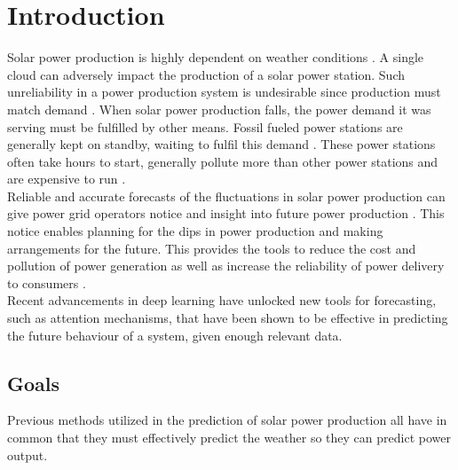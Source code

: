 \chapter{Introduction\label{cha:introduction}}

\vspace{1.5cm}

Solar power production is highly dependent on weather conditions \cite{lin_temporal_2020, lee_forecasting_2018, jaidee_very_2019, su_machine_2019, jang_solar_2016, jimenez_wrf-solar_2016, rognvaldsson_numerical_2013}. A single cloud can adversely impact the production of a solar power station. Such unreliability in a power production system is undesirable since production must match demand \cite{lee_forecasting_2018}. When solar power production falls, the power demand it was serving must be fulfilled by other means. Fossil fueled power stations are generally kept on standby, waiting to fulfil this demand \cite{lee_forecasting_2018}. These power stations often take hours to start, generally pollute more than other power stations and are expensive to run \cite{lee_forecasting_2018}.\\
Reliable and accurate forecasts of the fluctuations in solar power production can give power grid operators notice and insight into future power production \cite{lee_forecasting_2018}. This notice enables planning for the dips in power production and making arrangements for the future. This provides the tools to reduce the cost and pollution of power generation as well as increase the reliability of power delivery to consumers \cite{lee_forecasting_2018}.\\

Recent advancements in deep learning have unlocked new tools for forecasting, such as attention mechanisms, that have been shown to be effective in predicting the future behaviour of a system, given enough relevant data.\\



 \newpage
\section{Goals}
Previous methods utilized in the prediction of solar power production all have in common that they must effectively predict the weather so they can predict power output.

